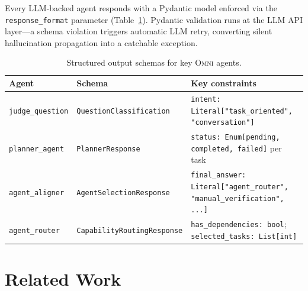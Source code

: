 \documentclass[11pt,a4paper]{article}
\newcommand{\omni}{\textsc{Omni}}
\begin{document}
Every LLM-backed agent responds with a Pydantic model enforced via the \texttt{response\_format} parameter (Table~\ref{tab:schemas}). Pydantic validation runs at the LLM API layer---a schema violation triggers automatic LLM retry, converting silent hallucination propagation into a catchable exception.

\begin{table}[h]
\centering
\caption{Structured output schemas for key \omni{} agents.}
\label{tab:schemas}
\small
\begin{tabular}{lll}
\toprule
\textbf{Agent} & \textbf{Schema} & \textbf{Key constraints} \\
\midrule
\texttt{judge\_question} & \texttt{QuestionClassification} & \texttt{intent: Literal["task\_oriented", "conversation"]} \\
\texttt{planner\_agent} & \texttt{PlannerResponse} & \texttt{status: Enum[pending, completed, failed]} per task \\
\texttt{agent\_aligner} & \texttt{AgentSelectionResponse} & \texttt{final\_answer: Literal["agent\_router", "manual\_verification", ...]} \\
\texttt{agent\_router} & \texttt{CapabilityRoutingResponse} & \texttt{has\_dependencies: bool}; \texttt{selected\_tasks: List[int]} \\
\bottomrule
\end{tabular}
\end{table}

\section{Related Work}
\label{sec:related}
\end{document}
